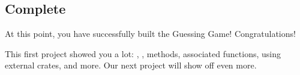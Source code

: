 \subsection{Complete}

At this point, you have successfully built the Guessing Game! Congratulations!

\blank

This first project showed you a lot: , , methods, associated functions, using external crates, and more. 
Our next project will show off even more.

